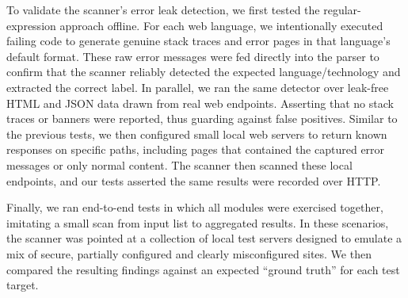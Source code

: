 \documentclass[pdflatex,sn-mathphys-num]{sn-jnl}
\numberwithin{equation}{section}
\theoremstyle{thmstyleone}
\theoremstyle{thmstyletwo}%
\theoremstyle{thmstylethree}%
\begin{document}
\vspace{1em}To validate the scanner's error leak detection, we first tested the regular-expression approach offline. 
For each web language, we intentionally executed failing code to 
generate genuine stack traces and error pages in that language's default format. These raw error messages were 
fed directly into the parser to confirm that the scanner reliably detected the expected language/technology and 
extracted the 
correct label. In parallel, we ran the same detector over leak-free HTML and JSON data drawn from real web endpoints. Asserting that 
no stack traces or banners were reported, thus guarding against false positives. Similar to the previous tests, we then configured small local web servers to return known responses on specific paths, including pages that 
contained the captured error messages or only normal content. The scanner then scanned these local endpoints, and our tests 
asserted the same results were recorded over HTTP. 

\vspace{1em}Finally, we ran end-to-end tests in which all modules were exercised together, imitating a small scan 
from input list to
aggregated results. In these scenarios, the scanner was pointed at a collection of local test servers designed to emulate a mix of 
secure, partially configured and clearly misconfigured sites. We then compared the resulting findings against an expected 
``ground truth'' for each test target. 



\end{document}
